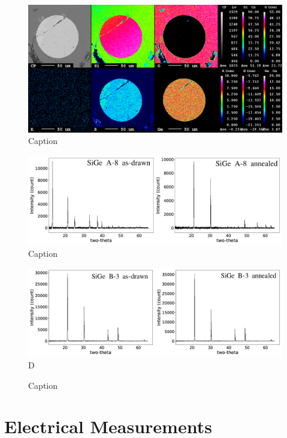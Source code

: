 \begin{figure}
    \centering
    \includegraphics[width=\textwidth]{fig/EDS/db30418-3_annealed.png}
    \caption{Caption}
    \label{annealed_sigeb}
\end{figure}


\begin{figure}
    \centering
    \includegraphics[width=\textwidth]{fig/EDS/sige-a-xrd.png}
    \caption{Caption}
    \label{xrda}
\end{figure}


\begin{figure}
    \centering
    \includegraphics[width=\textwidth]{fig/EDS/db30418-xrd.png}D
    \caption{Caption}
    \label{xrdb}
\end{figure}


\FloatBarrier
\section{Electrical Measurements}


